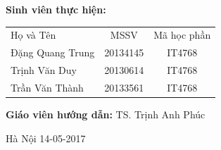 \documentclass[a4paper,11pt]{report}
\begin{document}
\hspace{1cm}\fontsize{14}{16}\selectfont \textbf{Sinh viên thực hiện:}
\begin{longtable}{l c c }
Họ và Tên & MSSV &    Mã học phần \\[0.5cm]
Đặng Quang Trung &    20134145 & IT4768\\
Trịnh Văn Duy & 20130614 & IT4768 \\
Trần Văn Thành & 20133561 & IT4768 \\
\end{longtable}
\hspace{0.3cm}\fontsize{14}{16}\selectfont \textbf{Giáo viên hướng dẫn:} TS. Trịnh Anh Phúc\\[1.0cm]
\begin{center}
\fontsize{16}{19}\selectfont Hà Nội 14-05-2017
\end{center} 
\tableofcontents
\end{document}
